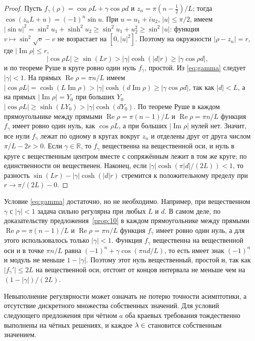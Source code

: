 \documentclass[12pt,a4paper]{article}
\numberwithin{equation}{section}
\theoremstyle{definition}
\newcommand{\R}{\mathbb R}
\let\C\relax\newcommand{\C}{\mathbb C}
\newcommand{\abs}[1]{\lvert#1\rvert}
\newcommand{\Imm}{\operatorname{Im}}
\newcommand{\Ree}{\operatorname{Re}}
\begin{document}
\begin{proof}
Пусть $f_\gamma(\rho)=\cos\rho L+\gamma\cos\rho d$ и $z_n=\pi(n-\frac12)/L$; тогда
$\cos(z_nL+u)=(-1)^n\sin u$. При $u=u_1+iu_2$, $\abs u\le\pi/2$, имеем
$\abs{\sin u}^2=\sin^2u_1+\sinh^2u_2\ge\sin^2u_1+u_2^2\ge\sin^2\abs u$: функция
$v\mapsto\sin^2\sqrt v-v$ не возрастает на $[0,\abs u^2]$. Поэтому на окружности
$\abs{\rho-z_n}=r$, где $\abs{\Imm\rho}\le r$,
\[
 \abs{\cos\rho L}\ge\sin(Lr)>\abs\gamma\cosh(\abs dr)\ge\abs{\gamma\cos\rho d},
\]
и по теореме Руше в круге ровно один нуль $f_\gamma$, простой. Из \eqref{eq:gamma} следует
$\abs\gamma<1$. На прямых $\Ree\rho=\pi n/L$ имеем
$\abs{\cos\rho L}=\cosh(L\Imm\rho)>\abs\gamma\cosh(d\Imm\rho)\ge\abs{\gamma\cos\rho d}$, так как
$\abs d<L$, а на прямых $\abs{\Imm\rho}=Y_0$ при больших $Y_0$
$\abs{\cos\rho L}\ge\sinh(LY_0)>\abs\gamma\cosh(dY_0)$. По теореме Руше в каждом прямоугольнике
между прямыми $\Ree\rho=\pi(n-1)/L$ и $\Ree\rho=\pi n/L$ функция $f_\gamma$ имеет ровно один нуль,
как $\cos\rho L$, а при больших $\abs{\Imm\rho}$ нулей нет. Значит, все нули $f_\gamma$ лежат по
одному в кругах вокруг $z_n$ и отделены друг от друга числом $\pi/L-2r>0$. Если $\gamma\in\R$, то
$f_\gamma$ вещественна на вещественной оси, и нуль в круге с вещественным центром вместе с
сопряжённым лежит в том же круге; по единственности он вещественен. Наконец, если
$\abs\gamma\cosh(\pi\abs d/(2L))<1$, то разность $\sin(Lr)-\abs\gamma\cosh(\abs dr)$ стремится к
положительному пределу при $r\to\pi/(2L)-0$.
\end{proof}

Условие \eqref{eq:gamma} достаточно, но не необходимо. Например, при вещественном $\gamma$ с
$\abs\gamma<1$ задача сильно регулярна при любых $L$ и $d$. В самом деле, по доказательству
предложения~\ref{prop:10} в каждом прямоугольнике между прямыми $\Ree\rho=\pi(n-1)/L$ и
$\Ree\rho=\pi n/L$ функция $f_\gamma$ имеет ровно один нуль, а для этого использовалось только
$\abs\gamma<1$. Функция $f_\gamma$ вещественна на вещественной оси и в точке $\pi n/L$ равна
$(-1)^n+\gamma\cos(\pi nd/L)$, то есть имеет знак $(-1)^n$ и модуль не меньше $1-\abs\gamma$.
Поэтому этот нуль вещественный, простой и, так как $\abs{f_\gamma'}\le2L$ на вещественной оси,
отстоит от концов интервала не меньше чем на $(1-\abs\gamma)/(2L)$.

Невыполнение регулярности может означать не потерю точности асимптотики,
а отсутствие дискретного множества собственных значений. Для условий следующего
предложения при чётном $a$ оба краевых требования тождественно выполнены на чётных
решениях, и каждое $\lambda\in\C$ становится собственным значением.
\end{document}
